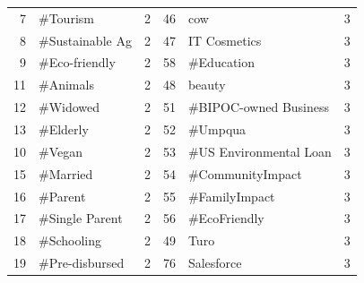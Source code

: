 \begin{longtable}{|r|l|l|r|l|l|}
	7           & \#Tourism                        & 2                                 & 46          & cow                               & 3                                 \\
	8           & \#Sustainable Ag                 & 2                                 & 47          & IT Cosmetics                      & 3                                 \\
	9           & \#Eco-friendly                   & 2                                 & 58          & \#Education                       & 3                                 \\
	11          & \#Animals                        & 2                                 & 48          & beauty                            & 3                                 \\
	12          & \#Widowed                        & 2                                 & 51          & \#BIPOC-owned Business            & 3                                 \\
	13          & \#Elderly                        & 2                                 & 52          & \#Umpqua                          & 3                                 \\
	10          & \#Vegan                          & 2                                 & 53          & \#US Environmental Loan           & 3                                 \\
	15          & \#Married                        & 2                                 & 54          & \#CommunityImpact                 & 3                                 \\
	16          & \#Parent                         & 2                                 & 55          & \#FamilyImpact                    & 3                                 \\
	17          & \#Single Parent                  & 2                                 & 56          & \#EcoFriendly                     & 3                                 \\
	18          & \#Schooling                      & 2                                 & 49          & Turo                              & 3                                 \\
	19          & \#Pre-disbursed                  & 2                                 & 76          & Salesforce                        & 3                                 \\
\end{longtable}


